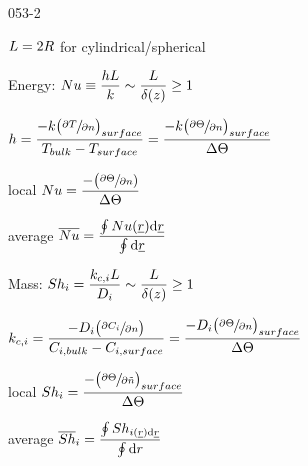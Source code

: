 \begin{mitframe}{053-2}
\begin{listone}
\item $\length=2\gasconst$ for cylindrical/spherical
\item Energy: $\nusselt\equiv\dfrac{\heattranscoeff\length}{\thermcond}\sim\dfrac{\length}{\blthick{(z)}}\geq{1}$
		\begin{listtwo}
        	\item $\heattranscoeff=\dfrac{-\thermcond\big(\sfrac{\partial\Temp}{\partial{n}}\big)_{surface}}{\Temp_{bulk}-\Temp_{surface}}=\dfrac{-\thermcond\big(\sfrac{\partial\dimltemp}{\partial{n}}\big)_{surface}}{\iipf\dimltemp}$
            \item local $\nusselt=\dfrac{-\big(\sfrac{\partial\dimltemp}{\partial{n}})}{\iipf
            \dimltemp}$
            \item average $\overline{\nusselt}=\dfrac{\oint\nusselt(\uline{\pos})\mathrm{d}\uline{\pos}}{\oint\mathrm{d}\uline{\pos}}$
            
        \end{listtwo}
\item Mass: $\sherwood_{\state}=\dfrac{\thermcond_{\lightspeed,\state}\length}{\pdiff}\sim\dfrac{\length}{\blthick(z)}\geq{1}$
\item $\thermcond_{c, \state}=\dfrac{-\pdiff\big(\sfrac{\partial\conc_{\state}}{\partial{n}}\big)}{\conc_{\state,bulk}-\conc_{\state,surface}}=\dfrac{-\pdiff\big(\sfrac{\partial\dimltemp}{\partial{n}}\big)_{surface}}{\iipf\dimltemp}$


\item local $\sherwood_{\state}=\dfrac{-\big(\sfrac{\partial\dimltemp}{\partial\tilde{n}}\big)_{surface}}{\iipf\dimltemp}$
\item average $\overline{\sherwood}_{\state}=\dfrac{\oint\sherwood_{\state(\uline{\pos})\mathrm{d}\uline{\pos}}}{\oint\mathrm{d}\pos}$

\end{listone}        
\end{mitframe}